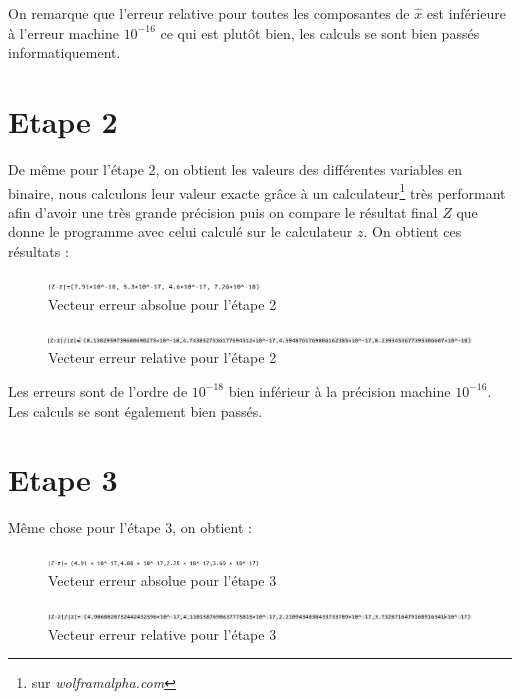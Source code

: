 \documentclass[12,french]{report}
\begin{document}
On remarque que l'erreur relative pour toutes les composantes de $\hat{x}$ est inférieure à l'erreur machine $10^{-16}$ ce qui est plutôt bien, les calculs se sont bien passés informatiquement.

\section{Etape 2}

De même pour l'étape 2, on obtient les valeurs des différentes variables en binaire, nous calculons leur valeur exacte grâce à un calculateur\footnote{sur \textit{wolframalpha.com}} très performant afin d'avoir une très grande précision puis on compare le résultat final $Z$ que donne le programme avec celui calculé sur le calculateur $z$. On obtient ces résultats :

\begin{figure}[H]
	\center
	\includegraphics[width=0.5\textwidth]{./Images/err_abs_x_2}
	\caption{Vecteur erreur absolue pour l'étape 2}
\end{figure}
\begin{figure}[H]
	\center
	\includegraphics[width=1\textwidth]{./Images/err_rel_x_2}
	\caption{Vecteur erreur relative pour l'étape 2}
\end{figure}

Les erreurs sont de l'ordre de $10^{-18}$ bien inférieur à la précision machine $10^{-16}$. Les calculs se sont également bien passés.

\section{Etape 3}

Même chose pour l'étape 3, on obtient :

\begin{figure}[H]
	\center
	\includegraphics[width=0.5\textwidth]{./Images/err_abs_x_3}
	\caption{Vecteur erreur absolue pour l'étape 3}
\end{figure}
\begin{figure}[H]
	\center
	\includegraphics[width=1\textwidth]{./Images/err_rel_x_3}
	\caption{Vecteur erreur relative pour l'étape 3}
\end{figure}
\end{document}
